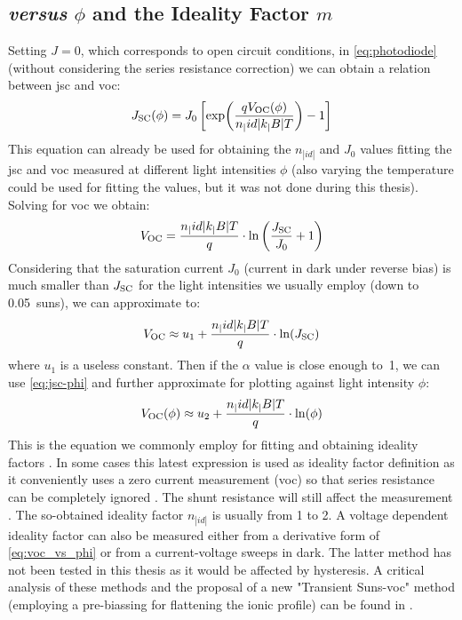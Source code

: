 	\subsection{ \textit{versus} $\phi$ and the Ideality Factor $m$}
		Setting $J=0$, which corresponds to open circuit conditions, in \cref{eq:photodiode} (without considering the series resistance correction) we can obtain a relation between \gls{jsc} and \gls{voc}:
		$$J_\mathrm{SC}(\phi) = J_0\left[\exp(\frac{qV_\mathrm{OC} (\phi)}{n_|id|k_|B|T})-1\right]$$
		This equation can already be used for obtaining the $n_|id|$ and $J_0$ values fitting the \gls{jsc} and \gls{voc} measured at different light intensities $\phi$ (also varying the temperature could be used for fitting the values, but it was not done during this thesis).
		Solving for \gls{voc} we obtain:
		$$V_\mathrm{OC} = \frac{n_|id|k_|B|T}{q}\cdot\ln\left(\frac{J_\mathrm{SC}}{J_0} + 1\right)$$
		Considering that the saturation current $J_0$ (current in dark under reverse bias) is much smaller than $J_\mathrm{SC}$ for the light intensities we usually employ (down to \SI{0.05}{suns}), we can approximate to:
		$$V_\mathrm{OC} \approx u_1 + \frac{n_|id|k_|B|T}{q}\cdot\ln(J_\mathrm{SC})$$
		where $u_1$ is a useless constant.
		Then if the $\alpha$ value is close enough to~1, we can use \cref{eq:jsc-phi} and further approximate for plotting against light intensity $\phi$:
		\begin{equation}\label{eq:voc_vs_phi}
			V_\mathrm{OC} (\phi) \approx u_2 + \frac{n_|id|k_|B|T}{q}\cdot\ln(\phi)
		\end{equation}
		This is the equation we commonly employ for fitting and obtaining ideality factors \cite{Nelson2003}.
		In some cases this latest expression is used as ideality factor definition as it conveniently uses a zero current measurement (\gls{voc}) so that series resistance can be completely ignored \cite{Kirchartz2012}.
		The shunt resistance will still affect the measurement \cite{Tvingstedt2017}.
		The so-obtained ideality factor $n_|id|$ is usually from 1 to 2.
		A voltage dependent ideality factor can also be measured either from a derivative form of \cref{eq:voc_vs_phi} \cite{Tvingstedt2017} or from a current-voltage sweeps in dark.
		The latter method has not been tested in this thesis as it would be affected by hysteresis.
		A critical analysis of these methods and the proposal of a new "Transient Suns-\gls{voc}" method (employing a pre-biassing for flattening the ionic profile) can be found in .

